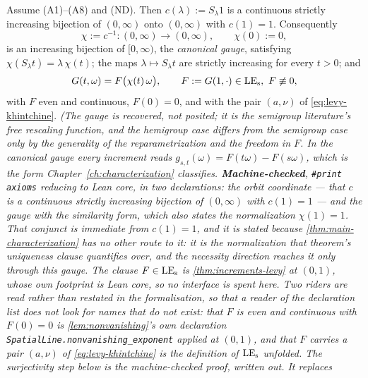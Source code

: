 \begin{proposition}\label{prop:canonical-gauge}
\leanok
{}
Assume (A1)--(A8) and (ND). Then $c(\lambda) := S_\lambda 1$ is a continuous strictly
increasing bijection of $(0,\infty)$ onto $(0,\infty)$ with $c(1) = 1$. Consequently
\[
  \chi := c^{-1} : (0,\infty) \to (0,\infty), \qquad \chi(0) := 0,
\]
is an increasing bijection of $[0,\infty)$, the \emph{canonical gauge}, satisfying
$\chi(S_\lambda t) = \lambda\,\chi(t)$; the maps $\lambda \mapsto S_\lambda t$ are strictly
increasing for every $t > 0$; and
\begin{equation}\label{eq:gauge}
  G(t,\omega) = F\bigl(\chi(t)\,\omega\bigr), \qquad F := G(1,\cdot) \in \mathrm{LE}_{\mathrm{s}},\ F \not\equiv 0,
\end{equation}
with $F$ even and continuous, $F(0) = 0$, and with the pair $(a,\nu)$ of
\ref{eq:levy-khintchine}.
\statusT\quad\emph{(The gauge is recovered, not posited; it is the semigroup literature's free
rescaling function, and the hemigroup case differs from the semigroup case only by the
generality of the reparametrization and the freedom in $F$. In the canonical gauge every
increment reads $g_{s,t}(\omega) = F(t\omega) - F(s\omega)$, which is the form
Chapter~\ref{ch:characterization} classifies. \textbf{Machine-checked}, \texttt{\#print axioms}
reducing to Lean core, in two declarations: the orbit coordinate --- that $c$ is a continuous
strictly increasing bijection of $(0,\infty)$ with $c(1) = 1$ --- and the gauge with the
similarity form, which also states the normalization $\chi(1) = 1$. That conjunct is immediate
from $c(1) = 1$, and it is stated because \ref{thm:main-characterization} has no other route to
it: it is the normalization that theorem's uniqueness clause quantifies over, and the necessity
direction reaches it only through this gauge.
The clause $F \in \mathrm{LE}_{\mathrm{s}}$ is \ref{thm:increments-levy} at $(0,1)$, whose own
footprint is Lean core, so no interface is spent here. Two riders are read rather than restated
in the formalisation, so that a reader of the declaration list does not look for names that do
not exist: that $F$ is even and continuous with $F(0) = 0$ is
\ref{lem:nonvanishing}'s own declaration \texttt{SpatialLine.nonvanishing\_exponent} applied at
$(0,1)$, and that $F$ carries a pair $(a,\nu)$ of \ref{eq:levy-khintchine} is the definition of
$\mathrm{LE}_{\mathrm{s}}$ unfolded. The surjectivity step below is the machine-checked proof, written out. It replaces
}
\end{proposition}
